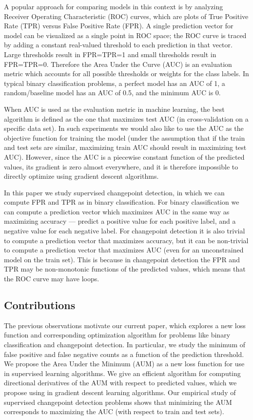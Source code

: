 \documentclass{article}
\begin{document}
A popular approach for comparing models in this context is by analyzing Receiver Operating Characteristic (ROC) curves, which are plots of True Positive Rate (TPR) versus False Positive Rate (FPR).
A single prediction vector for model can be visualized as a single point in ROC space; the ROC curve is traced by adding a constant real-valued threshold to each prediction in that vector.
Large thresholds result in FPR=TPR=1 and small thresholds result in FPR=TPR=0.
Therefore the Area Under the Curve (AUC) is an evaluation metric which accounts for all possible thresholds or weights for the class labels.
In typical binary classification problems, a perfect model has an AUC of 1, a random/baseline model has an AUC of 0.5, and the minimum AUC is 0.

When AUC is used as the evaluation metric in machine learning, the best algorithm is defined as the one that maximizes test AUC (in cross-validation on a specific data set).
In such experiments we would also like to use the AUC as the objective function for training the model (under the assumption that if the train and test sets are similar, maximizing train AUC should result in maximizing test AUC). 
However, since the AUC is a piecewise constant function of the predicted values, its gradient is zero almost everywhere, and it is therefore impossible to directly optimize using gradient descent algorithms.

In this paper we study supervised changepoint detection, in which we can compute FPR and TPR as in binary classification.
For binary classification we can compute a prediction vector which maximizes AUC in the same way as maximizing accuracy --- predict a positive value for each positive label, and a negative value for each negative label.
For changepoint detection it is also trivial to compute a prediction vector that maximizes accuracy, but it can be non-trivial to compute a prediction vector that maximizes AUC (even for an unconstrained model on the train set).
This is because in changepoint detection the FPR and TPR may be non-monotonic functions of the predicted values, which means that the ROC curve may have loops.

\subsection{Contributions}

The previous observations motivate our current paper, which explores a new loss function and corresponding optimization algorithm for problems like binary classification and changepoint detection.
In particular, we study the minimum of false positive and false negative counts as a function of the prediction threshold.
We propose the Area Under the Minimum (AUM) as a new loss function for use in supervised learning algorithms.
We give an efficient algorithm for computing directional derivatives of the AUM with respect to predicted values, which we propose using in gradient descent learning algorithms.
Our empirical study of supervised changepoint detection problems shows that minimizing the AUM corresponds to maximizing the AUC (with respect to train and test sets).
\end{document}
